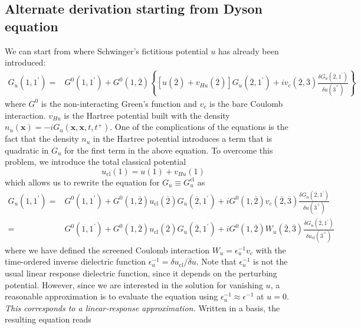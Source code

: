 \subsection{Alternate derivation starting from Dyson equation}
We can start from where Schwinger's fictitious potential $u$ has already been introduced:
\begin{align}
G_{u}\left(1,1^{\prime}\right)= & G^{0}\left(1,1^{\prime}\right)+G^{0}(1, \overline{2}) \left\{\left[u(\overline{2})+v_{H u}(\overline{2})\right] G_{u}\left(\overline{2}, 1^{\prime}\right)+i v_{c}(\overline{2}, \overline{3}) \frac{\delta G_{u}\left(\overline{2}, 1^{\prime}\right)}{\delta u\left(\overline{3}^{+}\right)}\right\} 
\end{align}
where $G^{0}$ is the non-interacting Green's function and $v_{c}$ is the bare Coulomb interaction. $v_{H u}$ is the Hartree potential built with the density $n_{u}(\mathbf{x})=-i G_{u}\left(\mathbf{x}, \mathbf{x}, t, t^{+}\right)$. One of the complications of the equations is the fact that the density $n_{u}$ in the Hartree potential introduces a term that is quadratic in $G_{u}$ for the first term in the above equation. To overcome this problem, we introduce the total classical potential
\begin{equation}
u_{\mathrm{cl}}(1)=u(1)+v_{H u}(1)
\end{equation}
which allows us to rewrite the equation for $G_{u}\equiv G_u^{\mathrm{cl}}$ as
\begin{align}
G_{u}\left(1,1^{\prime}\right)= & G^{0}\left(1,1^{\prime}\right)+G^{0}(1, \overline{2}) u_{\mathrm{cl}}(\overline{2}) G_{u}\left(\overline{2}, 1^{\prime}\right) +i G^{0}(1, \overline{2}) v_{c}(\overline{2}, \overline{3}) \frac{\delta G_{u}\left(\overline{2}, 1^{\prime}\right)}{\delta u\left(\overline{3}^{+}\right)} \\
= & G^{0}\left(1,1^{\prime}\right)+G^{0}(1, \overline{2}) u_{\mathrm{cl}}(\overline{2}) G_{u}\left(\overline{2}, 1^{\prime}\right) +i G^{0}(1, \overline{2}) W_{u}(\overline{2}, \overline{3}) \frac{\delta G_{u}\left(\overline{2}, 1^{\prime}\right)}{\delta u_{\mathrm{cl}}\left(\overline{3}^{+}\right)}
\end{align}
where we have defined the screened Coulomb interaction $W_{u} =\epsilon_{u}^{-1} v_{c}$ with the time-ordered inverse dielectric function $\epsilon_{u}^{-1} =\delta u_{\mathrm{cl}} / \delta u$. Note that $\epsilon_{u}^{-1}$ is not the usual linear response dielectric function, since it depends on the perturbing potential. However, since we are interested in the solution for vanishing $u$, a reasonable approximation is to evaluate the equation using $\epsilon_{u}^{-1} \approx \epsilon^{-1}$ at $u=0$. \emph{This corresponds to a linear-response approximation.} Written in a basis, the resulting equation reads
